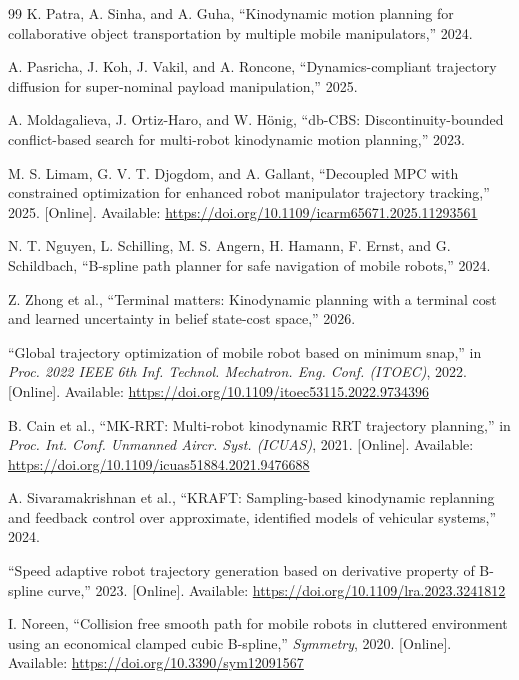 \begin{thebibliography}{99}
K. Patra, A. Sinha, and A. Guha, ``Kinodynamic motion planning for collaborative object transportation by multiple mobile manipulators,'' 2024.

A. Pasricha, J. Koh, J. Vakil, and A. Roncone, ``Dynamics-compliant trajectory diffusion for super-nominal payload manipulation,'' 2025.

A. Moldagalieva, J. Ortiz-Haro, and W. Hönig, ``db-CBS: Discontinuity-bounded conflict-based search for multi-robot kinodynamic motion planning,'' 2023.

M. S. Limam, G. V. T. Djogdom, and A. Gallant, ``Decoupled MPC with constrained optimization for enhanced robot manipulator trajectory tracking,'' 2025. [Online]. Available: \url{https://doi.org/10.1109/icarm65671.2025.11293561}

N. T. Nguyen, L. Schilling, M. S. Angern, H. Hamann, F. Ernst, and G. Schildbach, ``B-spline path planner for safe navigation of mobile robots,'' 2024.

Z. Zhong et al., ``Terminal matters: Kinodynamic planning with a terminal cost and learned uncertainty in belief state-cost space,'' 2026.

``Global trajectory optimization of mobile robot based on minimum snap,'' in \emph{Proc. 2022 IEEE 6th Inf. Technol. Mechatron. Eng. Conf. (ITOEC)}, 2022. [Online]. Available: \url{https://doi.org/10.1109/itoec53115.2022.9734396}

B. Cain et al., ``MK-RRT: Multi-robot kinodynamic RRT trajectory planning,'' in \emph{Proc. Int. Conf. Unmanned Aircr. Syst. (ICUAS)}, 2021. [Online]. Available: \url{https://doi.org/10.1109/icuas51884.2021.9476688}

A. Sivaramakrishnan et al., ``KRAFT: Sampling-based kinodynamic replanning and feedback control over approximate, identified models of vehicular systems,'' 2024.

``Speed adaptive robot trajectory generation based on derivative property of B-spline curve,'' 2023. [Online]. Available: \url{https://doi.org/10.1109/lra.2023.3241812}

I. Noreen, ``Collision free smooth path for mobile robots in cluttered environment using an economical clamped cubic B-spline,'' \emph{Symmetry}, 2020. [Online]. Available: \url{https://doi.org/10.3390/sym12091567}


\end{thebibliography}
